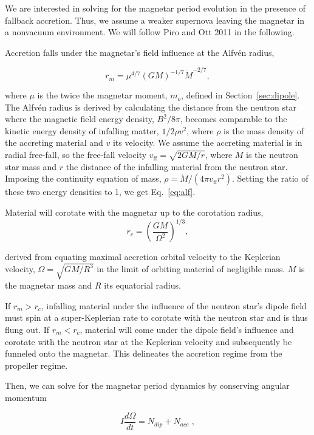 \documentclass{article}
\begin{document}
We are interested in solving for the magnetar period evolution in the presence of fallback accretion. Thus, we assume a weaker supernova leaving the magnetar in a nonvacuum environment.  We will follow Piro and Ott 2011 \cite{Piro:2011ed} in the following. \smallskip

Accretion falls under the magnetar's field influence at the Alfv\'en radius,

\begin{equation} \label{eq:alf}
r_m=\mu^{4/7}(G M)^{-1/7} \dot{M}^{-2/7},
\end{equation}

where $\mu$ is the twice the magnetar moment, $m_o$, defined in Section~\ref{sec:dipole}. The Alfv\'en radius is derived by calculating the distance from the neutron star where the magnetic field energy density, $B^2/8\pi$, becomes comparable to the kinetic energy density of infalling matter, $1/2 \rho v^2$, where $\rho$ is the mass density of the accreting material and $v$ its velocity. We assume the accreting material is in radial free-fall, so the free-fall velocity $v_{\mathrm{ff}}=\sqrt{2 G M/r}$, where $M$ is the neutron star mass and $r$ the distance of the infalling material from the neutron star. Imposing the continuity equation of mass, $\rho= \dot{M}/(4\pi v_{\mathrm{ff}}r^2)$. Setting the ratio of these two energy densities to 1, we get Eq.~\ref{eq:alf}.

Material will corotate with the magnetar up to the corotation radius,
\begin{equation}
r_c={(\frac{GM}{\Omega^2})}^{1/3},
\end{equation}

derived from equating maximal accretion orbital velocity to the Keplerian velocity, $\Omega=\sqrt{GM/R^3}$ in the limit of orbiting material of negligible mass. $M$ is the magnetar mass and $R$ its equatorial radius.

If $r_m>r_c$, infalling material under the influence of the neutron star's dipole field must spin at a super-Keplerian rate to corotate with the neutron star and is thus flung out. If $r_m<r_c$, material will come under the dipole field's influence and corotate with the neutron star at the Keplerian velocity and subsequently be funneled onto the magnetar. This delineates the accretion regime from the propeller regime.

Then, we can solve for the magnetar period dynamics by conserving angular momentum

\begin{equation}
I \frac{d\Omega}{dt} = N_{dip} + N_{acc}\,\,,
\end{equation}
\end{document}
